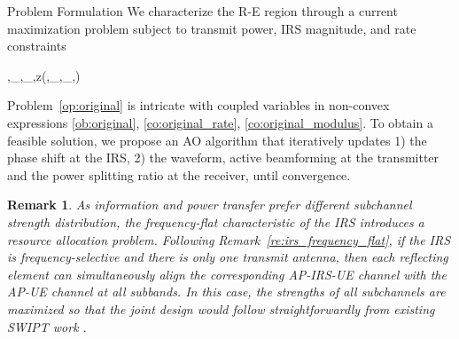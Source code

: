 \documentclass[journal]{IEEEtran}
\newtheorem{remark}{Remark}
\begin{document}
	\begin{section}{Problem Formulation}\label{se:problem_formulation}
		We characterize the R-E region through a current maximization problem subject to transmit power, IRS magnitude, and rate constraints
		\begin{maxi!}
			{\boldsymbol{\phi},_{},_{},\rho}{z(\boldsymbol{\phi},_{},_{},\rho)}{\label{op:original}}{\label{ob:original}}
			\label{co:original_power}
			\label{co:original_rate}
			\label{co:original_modulus}
		\end{maxi!}
		Problem~\eqref{op:original} is intricate with coupled variables in non-convex expressions \eqref{ob:original}, \eqref{co:original_rate}, \eqref{co:original_modulus}. To obtain a feasible solution, we propose an AO algorithm that iteratively updates 1) the phase shift at the IRS, 2) the waveform, active beamforming at the transmitter and the power splitting ratio at the receiver, until convergence.
		\begin{remark}\label{re:irs_subchannel_alignment}
			As information and power transfer prefer different subchannel strength distribution, the frequency-flat characteristic of the IRS introduces a resource allocation problem. Following Remark~\ref{re:irs_frequency_flat}, if the IRS is frequency-selective and there is only one transmit antenna, then each reflecting element can simultaneously align the corresponding AP-IRS-UE channel with the AP-UE channel at all subbands. In this case, the strengths of all subchannels are maximized so that the joint design would follow straightforwardly from existing SWIPT work \cite{Clerckx2018b}.
		\end{remark}



\end{section}
\end{document}
